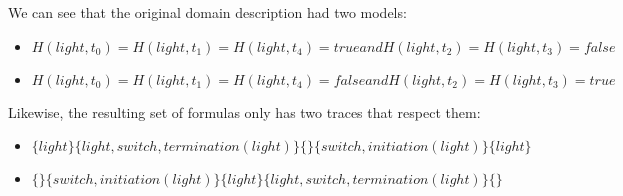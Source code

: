 We can see that the original domain description had two models:
\begin{itemize}
  \item $H(light,t_0)=H(light,t_1)=H(light,t_4)=true and H(light,t_2)=H(light,t_3)=false$
  \item $H(light,t_0)=H(light,t_1)=H(light,t_4)=false and H(light,t_2)=H(light,t_3)=true$
\end{itemize}

Likewise, the resulting set of formulas only has two traces that respect them:
\begin{itemize}
  \item $\{light\}\{light,switch,termination(light)\}\{\}\{switch,initiation(light)\}\{light\}$
  \item $\{\}\{switch,initiation(light)\}\{light\}\{light,switch,termination(light)\}\{\}$
\end{itemize}

          \iffalse

          \subsection{Naive approach from iterative}

          To make the translation, we need to start from a domain langage for wich $\Pi$ is a discrete set of timepoint, and $\preceq$ is a total ordering of $\Pi$. On top of that, $\Pi$ need a timepoint $T_0$ such as $\forall T_i \in \Pi, T_0\preceq T_i$.

          \subsubsection{Propositions}

          \begin{itemize}
            \item c-proposition

            $$\Box(A_i\bigwedge C_i)\rightarrow \circ F_i$$ or $$\Box(A_i\bigwedge C_i)\rightarrow \circ \neg F_i$$
            \item h-proposition

            $$\circ^{T_i}F_i$$ or $$\circ^{T_i} \neg F_i$$
            \item t-proposition

            $$\circ^{T_i}A_i$$
          \end{itemize}

          \fi
